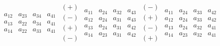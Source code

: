 \documentclass[a4paper,11pt,twoside]{report}
\begin{document}
\begin{align*}
\begin{matrix}
	a_{12} & a_{23} & a_{34} & a_{41} \\
a_{13} & a_{22} & a_{34} & a_{41} \\
a_{14} & a_{22} & a_{33} & a_{41}\end{matrix}
	\begin{matrix} (+) \\ (-) \\ (+) \\ (-) \end{matrix}
	\begin{matrix} a_{11} & a_{24} & a_{32} & a_{43} \\
	a_{12} & a_{24} & a_{31} & a_{43} \\
a_{13} & a_{24} & a_{31} & a_{42} \\
a_{14} & a_{23} & a_{31} & a_{42}\end{matrix}
	\begin{matrix} (-) \\ (+) \\ (-) \\ (+) \end{matrix}
	\begin{matrix} a_{11} & a_{24} & a_{33} & a_{42} \\
	a_{12} & a_{24} & a_{33} & a_{42} \\
a_{13} & a_{24} & a_{32} & a_{41} \\
a_{14} & a_{23} & a_{32} & a_{41} \end{matrix}
\\
\end{align*}
\newpage
\end{document}
